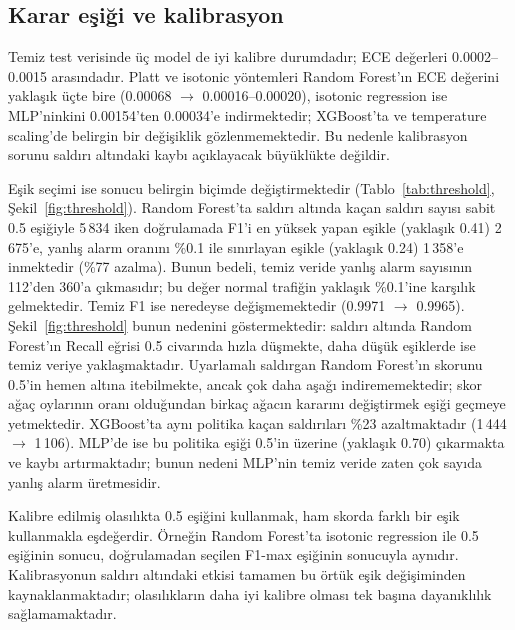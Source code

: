 \documentclass[conference]{IEEEtran}
\begin{document}
\subsection{Karar eşiği ve kalibrasyon}
Temiz test verisinde üç model de iyi kalibre durumdadır; ECE değerleri 0.0002--0.0015 arasındadır. Platt ve isotonic yöntemleri Random Forest'ın ECE değerini yaklaşık üçte bire (0.00068 $\rightarrow$ 0.00016--0.00020), isotonic regression ise MLP'ninkini 0.00154'ten 0.00034'e indirmektedir; XGBoost'ta ve temperature scaling'de belirgin bir değişiklik gözlenmemektedir. Bu nedenle kalibrasyon sorunu saldırı altındaki kaybı açıklayacak büyüklükte değildir.

Eşik seçimi ise sonucu belirgin biçimde değiştirmektedir (Tablo~\ref{tab:threshold}, Şekil~\ref{fig:threshold}). Random Forest'ta saldırı altında kaçan saldırı sayısı sabit 0.5 eşiğiyle 5\,834 iken doğrulamada F1'i en yüksek yapan eşikle (yaklaşık 0.41) 2\,675'e, yanlış alarm oranını \%0.1 ile sınırlayan eşikle (yaklaşık 0.24) 1\,358'e inmektedir (\%77 azalma). Bunun bedeli, temiz veride yanlış alarm sayısının 112'den 360'a çıkmasıdır; bu değer normal trafiğin yaklaşık \%0.1'ine karşılık gelmektedir. Temiz F1 ise neredeyse değişmemektedir (0.9971 $\rightarrow$ 0.9965). Şekil~\ref{fig:threshold} bunun nedenini göstermektedir: saldırı altında Random Forest'ın Recall eğrisi 0.5 civarında hızla düşmekte, daha düşük eşiklerde ise temiz veriye yaklaşmaktadır. Uyarlamalı saldırgan Random Forest'ın skorunu 0.5'in hemen altına itebilmekte, ancak çok daha aşağı indirememektedir; skor ağaç oylarının oranı olduğundan birkaç ağacın kararını değiştirmek eşiği geçmeye yetmektedir. XGBoost'ta aynı politika kaçan saldırıları \%23 azaltmaktadır (1\,444 $\rightarrow$ 1\,106). MLP'de ise bu politika eşiği 0.5'in üzerine (yaklaşık 0.70) çıkarmakta ve kaybı artırmaktadır; bunun nedeni MLP'nin temiz veride zaten çok sayıda yanlış alarm üretmesidir.

Kalibre edilmiş olasılıkta 0.5 eşiğini kullanmak, ham skorda farklı bir eşik kullanmakla eşdeğerdir. Örneğin Random Forest'ta isotonic regression ile 0.5 eşiğinin sonucu, doğrulamadan seçilen F1-max eşiğinin sonucuyla aynıdır. Kalibrasyonun saldırı altındaki etkisi tamamen bu örtük eşik değişiminden kaynaklanmaktadır; olasılıkların daha iyi kalibre olması tek başına dayanıklılık sağlamamaktadır.
\end{document}
